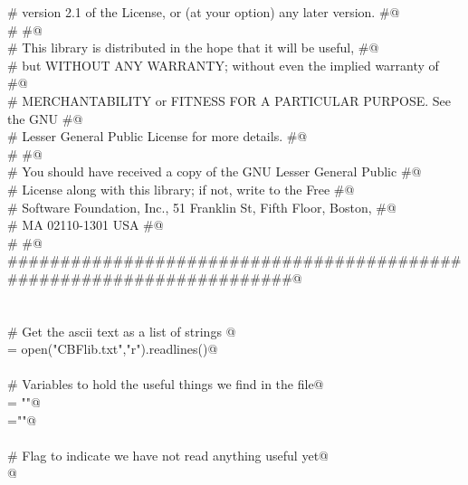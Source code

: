 \documentclass[10pt,a4paper,twoside,notitlepage]{article}
\begin{document}
\begin{flushleft}
\begin{minipage}{\linewidth}
\begin{list}{}{}
\mbox{}\verb@# version 2.1 of the License, or (at your option) any later version. #@\\
\mbox{}\verb@#                                                                    #@\\
\mbox{}\verb@# This library is distributed in the hope that it will be useful,    #@\\
\mbox{}\verb@# but WITHOUT ANY WARRANTY; without even the implied warranty of     #@\\
\mbox{}\verb@# MERCHANTABILITY or FITNESS FOR A PARTICULAR PURPOSE.  See the GNU  #@\\
\mbox{}\verb@# Lesser General Public License for more details.                    #@\\
\mbox{}\verb@#                                                                    #@\\
\mbox{}\verb@# You should have received a copy of the GNU Lesser General Public   #@\\
\mbox{}\verb@# License along with this library; if not, write to the Free         #@\\
\mbox{}\verb@# Software Foundation, Inc., 51 Franklin St, Fifth Floor, Boston,    #@\\
\mbox{}\verb@# MA  02110-1301  USA                                                #@\\
\mbox{}\verb@#                                                                    #@\\
\mbox{}\verb@######################################################################@\\
\mbox{}\verb@@\\
\mbox{}\verb@@\\
\mbox{}\verb@# Get the ascii text as a list of strings @\\
\mbox{}\verb@lines = open("CBFlib.txt","r").readlines()@\\
\mbox{}\verb@@\\
\mbox{}\verb@# Variables to hold the useful things we find in the file@\\
\mbox{}\verb@docstring = "\n"@\\
\mbox{}\verb@name=""@\\
\mbox{}\verb@@\\
\mbox{}\verb@# Flag to indicate we have not read anything useful yet@\\
\mbox{}@\\
\mbox{}\verb@@\\
\mbox{}\verb@@\\

\end{list}
\end{minipage}
\end{flushleft}
\end{document}
